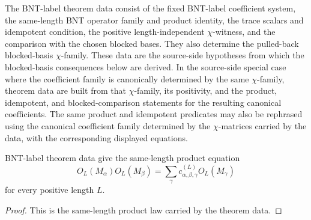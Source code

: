 \begin{definition}%
    \label{def:mpdo_bnt_label_theorem_data}
    \leanok
    The BNT-label theorem data consist of the fixed BNT-label coefficient
    system, the same-length BNT operator family and product identity, the trace
    scalars and idempotent condition, the positive length-independent
    $\chi$-witness, and the comparison with the chosen blocked bases.
    They also determine the pulled-back blocked-basis $\chi$-family. These
    data are the source-side hypotheses from which the blocked-basis
    consequences below are derived.
    In the source-side special case where the coefficient family is
    canonically determined by the same $\chi$-family, theorem data are built
    from that $\chi$-family, its positivity, and the product, idempotent, and
    blocked-comparison statements for the resulting canonical coefficients.
    The same product and idempotent predicates may also be rephrased using the
    canonical coefficient family determined by the $\chi$-matrices carried by
    the data, with the corresponding displayed equations.
\end{definition}

\begin{theorem}%
    \label{thm:mpdo_bnt_label_theorem_data_same_length_product_eq_sum}
    \leanok
    BNT-label theorem data give the same-length product equation
    \[
        O_L(M_\alpha)O_L(M_\beta)
        = \sum_\gamma
        c^{(L)}_{\alpha,\beta,\gamma} O_L(M_\gamma)
    \]
    for every positive length $L$.
\end{theorem}
\begin{proof}\leanok
    This is the same-length product law carried by the theorem data.
\end{proof}

